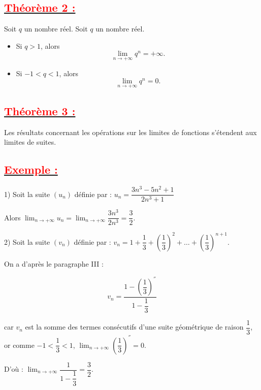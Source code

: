\documentclass[12pt]{article}
\begin{document}
\subsection*{\underline{\textbf{\textcolor{red}{Théorème 2 :}}}}
Soit $q$ un nombre réel.
Soit \( q \) un nombre réel.

\begin{itemize}
    \item Si \( q > 1 \), alors
    \[
    \lim_{n \rightarrow +\infty} q^n = +\infty.
    \]
    
    \item Si \( -1 < q < 1 \), alors
    \[
    \lim_{n \rightarrow +\infty} q^n = 0.
    \]
\end{itemize}
\subsection*{\underline{\textbf{\textcolor{red}{Théorème 3 :}}}}
Les résultats concernant les opérations sur les limites de fonctions s'étendent aux limites de suites.
\subsection*{\underline{\textbf{\textcolor{red}{Exemple :}}}}

1) Soit la suite \( (u_{n}) \) définie par : \( u_{n} = \dfrac{3n^{3} - 5n^{2} + 1}{2n^{3} + 1} \)

Alors \( \lim_{n \rightarrow +\infty} u_{n} = \lim_{n \rightarrow +\infty} \dfrac{3n^{3}}{2n^{3}} = \dfrac{3}{2} \).

2) Soit la suite \( (v_{n}) \) définie par : \( v_{n} = 1 + \dfrac{1}{3} + \left(\dfrac{1}{3}\right)^{2} + \ldots + \left(\dfrac{1}{3}\right)^{n+1} \).

On a d'après le paragraphe III :

\[
v_{n} = \dfrac{1 - \left(\dfrac{1}{3}\right)^{''}}{1 - \dfrac{1}{3}}
\]

car \( v_{n} \) est la somme des termes consécutifs d'une suite géométrique de raison \( \dfrac{1}{3} \), or comme \( -1 < \dfrac{1}{3} < 1 \), \( \lim_{n \rightarrow +\infty} \left(\dfrac{1}{3}\right)^{''} = 0 \).

D'où : \( \lim_{n \rightarrow +\infty} \dfrac{1}{1 - \dfrac{1}{3}} = \dfrac{3}{2} \).
\end{document}
